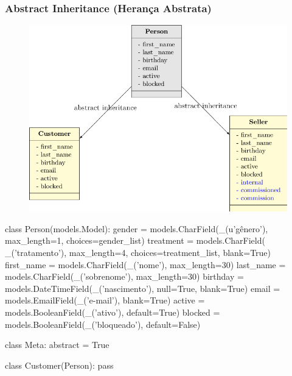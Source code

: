 \documentclass{beamer}
\begin{document}
{\begin{frame}
\end{frame}

\begin{frame}\frametitle{Abstract Inheritance (Herança Abstrata)}

    \begin{figure}[h]
      \centering
        \includegraphics[height=.85\paperheight]{img/051abstract}
    \end{figure}

\end{frame}

\begin{frame}[fragile]
	
\begin{pythoncode}
class Person(models.Model):
    gender = models.CharField(_(u'gênero'), max_length=1, choices=gender_list)
    treatment = models.CharField(
        _('tratamento'), max_length=4, choices=treatment_list, blank=True)
    first_name = models.CharField(_('nome'), max_length=30)
    last_name = models.CharField(_('sobrenome'), max_length=30)
    birthday = models.DateTimeField(_('nascimento'), null=True, blank=True)
    email = models.EmailField(_('e-mail'), blank=True)
    active = models.BooleanField(_('ativo'), default=True)
    blocked = models.BooleanField(_('bloqueado'), default=False)

class Meta:
    abstract = True


class Customer(Person):
    pass
\end{pythoncode}

\end{frame}

\begin{frame}[fragile]


\end{frame}}
\end{document}
